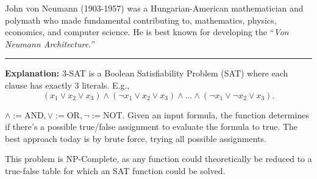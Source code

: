 \begin{Tip}
    John von Neumann (1903-1957) was a Hungarian-American mathematician and polymath who made fundamental contributing to, mathematics, physics, economics, and computer science. He is best known for developing the ``\textit{Von Neumann Architecture.}''
\end{Tip}

\newpage 

\begin{Func}[3-SAT]
    
        \label{3-SAT}
        \vspace{-.5em}
        \begin{algorithm}[H]
            \SetAlgoLined
        \end{algorithm}
        \noindent
        \rule{\textwidth}{0.4pt}
        \textbf{Explanation:} 3-SAT is a Boolean Satisfiability Problem (SAT) where each clause has exactly 3 literals. E.g.,
        $$ (x_1 \lor x_2 \lor x_3) \land (\neg x_1 \lor x_2 \lor x_3) \land \dots \land (\neg x_1 \lor \neg x_2 \lor x_3).$$

        \noindent
        $\land:=\text{AND}, \lor:=\text{OR}, \neg:=\text{NOT}$. Given an input formula, the function determines if there's a possible 
        true/false assignment to evaluate the formula to true. The best approach today is by brute force, trying all possible assignments.

        This problem is NP-Complete, as any function could theoretically be reduced to a true-false table for which an SAT function could be solved.
        
\end{Func}

